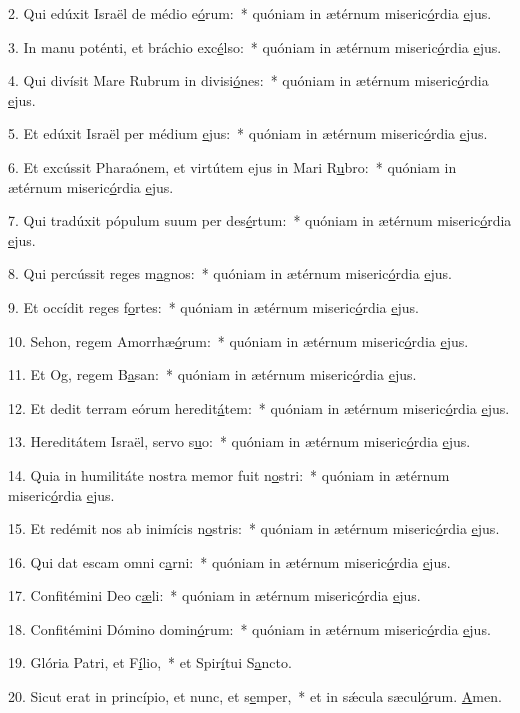 2. Qui edúxit Israël de médio e\uline{ó}rum:~* quóniam in ætérnum miseric\uline{ó}rdia \uline{e}jus.\par 
3. In manu poténti, et bráchio exc\uline{é}lso:~* quóniam in ætérnum miseric\uline{ó}rdia \uline{e}jus.\par 
4. Qui divísit Mare Rubrum in divisi\uline{ó}nes:~* quóniam in ætérnum miseric\uline{ó}rdia \uline{e}jus.\par 
5. Et edúxit Israël per médium \uline{e}jus:~* quóniam in ætérnum miseric\uline{ó}rdia \uline{e}jus.\par 
6. Et excússit Pharaónem, et virtútem ejus in Mari R\uline{u}bro:~* quóniam in ætérnum miseric\uline{ó}rdia \uline{e}jus.\par 
7. Qui tradúxit pópulum suum per des\uline{é}rtum:~* quóniam in ætérnum miseric\uline{ó}rdia \uline{e}jus.\par 
8. Qui percússit reges m\uline{a}gnos:~* quóniam in ætérnum miseric\uline{ó}rdia \uline{e}jus.\par 
9. Et occídit reges f\uline{o}rtes:~* quóniam in ætérnum miseric\uline{ó}rdia \uline{e}jus.\par 
10. Sehon, regem Amorrhæ\uline{ó}rum:~* quóniam in ætérnum miseric\uline{ó}rdia \uline{e}jus.\par 
11. Et Og, regem B\uline{a}san:~* quóniam in ætérnum miseric\uline{ó}rdia \uline{e}jus.\par 
12. Et dedit terram eórum heredit\uline{á}tem:~* quóniam in ætérnum miseric\uline{ó}rdia \uline{e}jus.\par 
13. Hereditátem Israël, servo s\uline{u}o:~* quóniam in ætérnum miseric\uline{ó}rdia \uline{e}jus.\par 
14. Quia in humilitáte nostra memor fuit n\uline{o}stri:~* quóniam in ætérnum miseric\uline{ó}rdia \uline{e}jus.\par 
15. Et redémit nos ab inimícis n\uline{o}stris:~* quóniam in ætérnum miseric\uline{ó}rdia \uline{e}jus.\par 
16. Qui dat escam omni c\uline{a}rni:~* quóniam in ætérnum miseric\uline{ó}rdia \uline{e}jus.\par 
17. Confitémini Deo c\uline{æ}li:~* quóniam in ætérnum miseric\uline{ó}rdia \uline{e}jus.\par 
18. Confitémini Dómino domin\uline{ó}rum:~* quóniam in ætérnum miseric\uline{ó}rdia \uline{e}jus.\par 
19. Glória Patri, et F\uline{í}lio,~* et Spir\uline{í}tui S\uline{a}ncto.\par 
20. Sicut erat in princípio, et nunc, et s\uline{e}mper,~* et in sǽcula sæcul\uline{ó}rum. \uline{A}men.\par 
